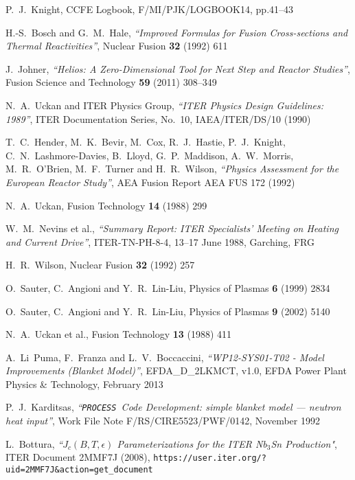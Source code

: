 \documentclass[11pt,a4paper]{report}
\newcommand{\process}{\mbox{\texttt{PROCESS}}}
\begin{document}
\begin{thebibliography}{99}
P.\ J.\ Knight, CCFE Logbook, F/MI/PJK/LOGBOOK14, pp.41--43

H.-S.\ Bosch and G.\ M.\ Hale,
\textit{``Improved Formulas for Fusion Cross-sections and Thermal Reactivities''},
Nuclear Fusion \textbf{32} (1992) 611

J.\ Johner,
\textit{``Helios: A Zero-Dimensional Tool for Next Step and Reactor Studies''},
Fusion Science and Technology \textbf{59} (2011) 308--349

N.\ A.\ Uckan and ITER Physics Group,
\textit{``ITER Physics Design Guidelines: 1989''},
ITER Documentation Series, No.\ 10, IAEA/ITER/DS/10
(1990)

T.\ C.\ Hender, M.\ K.\ Bevir, M.\ Cox, R.\ J.\ Hastie, P.\ J.\
Knight, C.\ N.\ Lashmore-Davies, B.\ Lloyd, G.\ P.\ Maddison, A.\ W.\
Morris, M.\ R.\ O'Brien, M.\ F.\ Turner and H.\ R.\ Wilson,
\textit{``Physics Assessment for the European Reactor Study''},
AEA Fusion Report AEA FUS 172
(1992)

N.\ A.\ Uckan,
Fusion Technology \textbf{14} (1988) 299

W.\ M.\ Nevins et al.,
\textit{``Summary Report: ITER Specialists' Meeting on Heating and
Current Drive''},
ITER-TN-PH-8-4,
13--17 June 1988, Garching, FRG

H.\ R.\ Wilson,
Nuclear Fusion \textbf{32} (1992) 257

O.\ Sauter, C.\ Angioni and Y.\ R.\ Lin-Liu,
Physics of Plasmas \textbf{6} (1999) 2834

O.\ Sauter, C.\ Angioni and Y.\ R.\ Lin-Liu,
Physics of Plasmas \textbf{9} (2002) 5140

N.\ A.\ Uckan et al.,
Fusion Technology \textbf{13} (1988) 411

A.\ Li~Puma, F.\ Franza and L.\ V.\ Boccaccini, \textit{``WP12-SYS01-T02 -
  Model Improvements (Blanket Model)''},
EFDA\_D\_2LKMCT, v1.0, EFDA Power Plant Physics \& Technology, February 2013

\bibitem{Panos}
P.\ J.\ Karditsas, \textit{``\process\ Code Development: simple blanket model ---
neutron heat input''},
Work File Note F/RS/CIRE5523/PWF/0142, November 1992

L.\ Bottura,
\textit{``$J_c(B,T,\epsilon)$ Parameterizations for the ITER Nb$_3$Sn
  Production"},
ITER Document 2MMF7J (2008),
\texttt{https://user.iter.org/?uid=2MMF7J\&action=get\_document}


\end{thebibliography}
\end{document}
